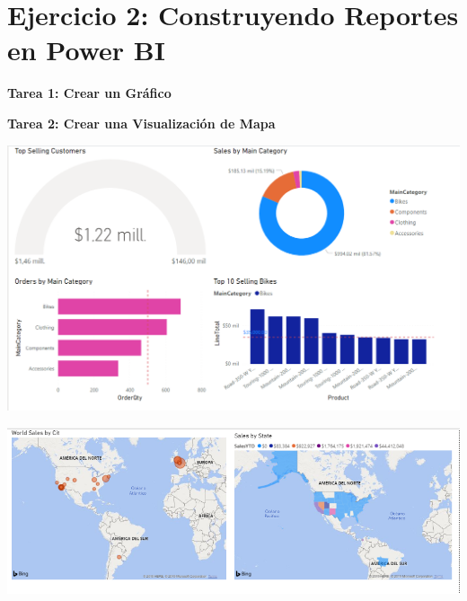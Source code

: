 \section*{Ejercicio 2: Construyendo Reportes en Power BI}
\item \textbf{Tarea 1: Crear un Gráfico}
\item \textbf{Tarea 2: Crear una Visualización de Mapa}
\textbf{}
\begin{center}
\includegraphics[width=15cm]{./Imagenes/img5} 
\end{center}
\textbf{}
\textbf{}
\begin{center}
\includegraphics[width=15cm]{./Imagenes/5} 
\end{center}